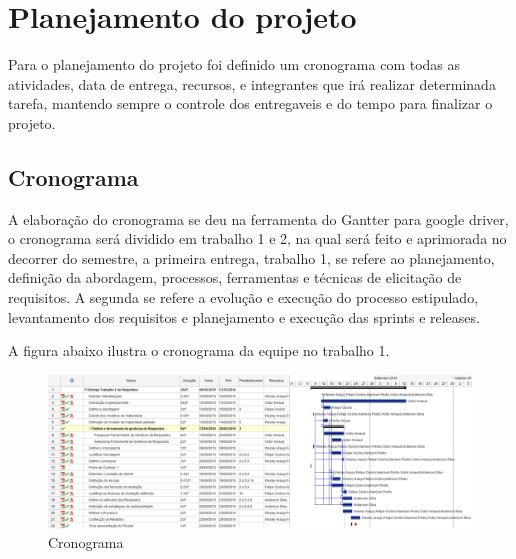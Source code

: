 \chapter{Planejamento do projeto}

  Para o planejamento do projeto foi definido um cronograma com todas as atividades, data de entrega, recursos, e integrantes que irá
  realizar determinada tarefa, mantendo sempre o controle dos entregaveis e do tempo para finalizar o projeto.

\section{Cronograma}

  A elaboração do cronograma se deu na ferramenta do Gantter para google driver, o cronograma será dividido em trabalho 1 e 2,
  na qual será feito e aprimorada no decorrer do semestre, a primeira entrega, trabalho 1, se refere ao planejamento,
  definição da abordagem, processos, ferramentas e técnicas de elicitação de requisitos. A segunda se refere a evolução e execução
  do processo estipulado, levantamento dos requisitos e planejamento e execução das sprints e releases.

  A figura abaixo ilustra o cronograma da equipe no trabalho 1.

  \begin{figure}[!h]
    \centering
    \includegraphics[width=15cm, keepaspectratio=true]{figuras/cronograma/cronograma.eps}
    \caption{Cronograma}
  \end{figure}

